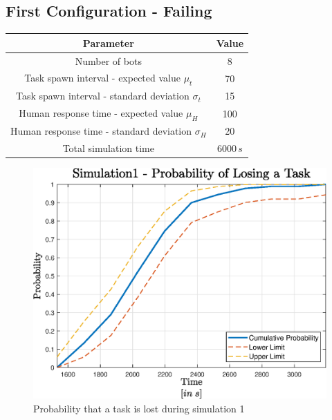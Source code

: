 \documentclass{article}
\begin{document}
		\subsection{First Configuration - Failing}
			\label{sub:sim1}
			\begin{center}
				\begin{tabular}{ |c|c|}
					\hline
					Parameter & Value \\
					\hline
					\hline
					Number of bots & 8\\
					\hline
					Task spawn interval - expected value $\mu_t$ & 70\\
					\hline					
					Task spawn interval - standard deviation $\sigma_t$ & 15\\
					\hline
					Human response time - expected value $\mu_H$ & 100\\
					\hline					
					Human response time - standard deviation $\sigma_H$ & 20\\
					\hline
					Total simulation time & $6000\, s$ \\
					\hline
				\end{tabular}
			\end{center}
			\begin{figure}[H]
				\centering
				\includegraphics[scale = 0.7]{Images/Simulation1}
				\caption{Probability that a task is lost during simulation 1}
				\label{fig:sim1}
			\end{figure}
		
\end{document}
